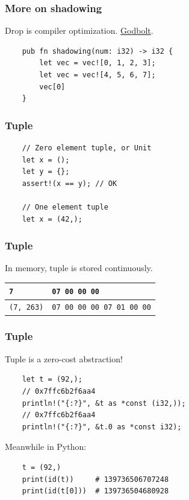 \documentclass[aspectratio=1610,t]{beamer}
\begin{document}

\begin{frame}[fragile]
\frametitle{More on shadowing}
Drop is compiler optimization. \href{https://rust.godbolt.org/z/3b5hfr7db}{Godbolt}.

\begin{verbatim}
    pub fn shadowing(num: i32) -> i32 {
        let vec = vec![0, 1, 2, 3];
        let vec = vec![4, 5, 6, 7];
        vec[0]
    }
\end{verbatim}
\end{frame}


\begin{frame}[fragile]
\frametitle{Tuple}
\begin{verbatim}
    // Zero element tuple, or Unit
    let x = ();
    let y = {};
    assert!(x == y); // OK

    // One element tuple
    let x = (42,);
\end{verbatim}
\end{frame}


\begin{frame}[fragile]
\frametitle{Tuple}
In memory, tuple is stored continuously.

\begin{table}[]
\begin{tabular}{|l|l|}
\hline
\texttt{7}        & \texttt{07 00 00 00}             \\ \hline
\texttt{(7, 263)} & \texttt{07 00 00 00 07 01 00 00} \\ \hline
\end{tabular}
\end{table}
\end{frame}


\begin{frame}[fragile]
\frametitle{Tuple}
Tuple is a zero-cost abstraction!

\begin{verbatim}
    let t = (92,);
    // 0x7ffc6b2f6aa4
    println!("{:?}", &t as *const (i32,));
    // 0x7ffc6b2f6aa4
    println!("{:?}", &t.0 as *const i32);
\end{verbatim}

Meanwhile in Python:

\begin{verbatim}
    t = (92,)
    print(id(t))     # 139736506707248
    print(id(t[0]))  # 139736504680928
\end{verbatim}
\end{frame}
\end{document}
